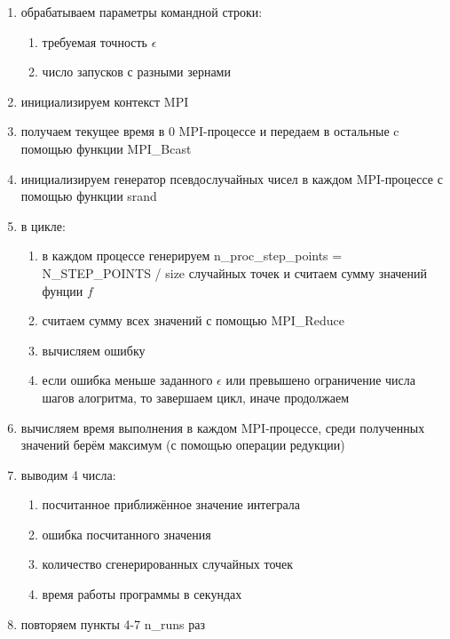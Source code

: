 \documentclass[oneside, final, 12pt]{extarticle}
\begin{document}
\begin{enumerate}
    \item обрабатываем параметры командной строки:

          \begin{enumerate}
              \item требуемая точность $ \epsilon $
              \item число запусков с разными зернами
          \end{enumerate}

    \item инициализируем контекст MPI
    \item получаем текущее время в 0 MPI-процессе и передаем в остальные c помощью функции MPI\_Bcast
    \item инициализируем генератор псевдослучайных чисел в каждом MPI-процессе с помощью функции srand
    \item в цикле:

          \begin{enumerate}
              \item в каждом процессе генерируем n\_proc\_step\_points = N\_STEP\_POINTS / size случайных точек и считаем сумму значений фунции $ f $
              \item считаем сумму всех значений с помощью MPI\_Reduce
              \item вычисляем ошибку
              \item если ошибка меньше заданного $ \epsilon $ или превышено ограничение числа шагов алогритма, то завершаем цикл, иначе продолжаем
          \end{enumerate}

    \item вычисляем время выполнения в каждом MPI-процессе, среди полученных значений берём максимум (с помощью операции редукции)
    \item выводим 4 числа:
          \begin{enumerate}
              \item посчитанное приближённое значение интеграла
              \item ошибка посчитанного значения
              \item количество сгенерированных случайных точек
              \item время работы программы в секундах
          \end{enumerate}
    \item повторяем пункты 4-7 n\_runs раз
\end{enumerate}
\end{document}
